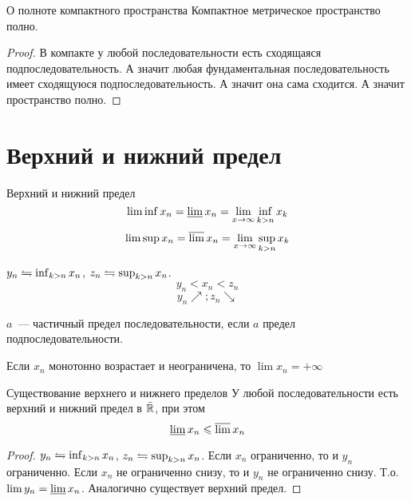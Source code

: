 \begin{theorem}{О полноте компактного пространства}
Компактное метрическое пространство полно.
\end{theorem}
\begin{proof}
В компакте у любой последовательности есть сходящаяся подпоследовательность. А значит любая фундаментальная последовательность имеет сходящуюся подпоследовательность.
А значит она сама сходится. А значит пространство полно.
\end{proof}

\section{Верхний и нижний предел}

\begin{Def}
Верхний и нижний предел
$$\liminf x_n = \varliminf x_n = \lim_{x\rightarrow\infty}\inf_{k>n} x_k$$
$$\limsup x_n = \varlimsup x_n = \lim_{x\rightarrow\infty}\sup_{k>n} x_k$$
\end{Def}
\begin{Rem}
$y_n \leftrightharpoons \inf_{k>n} x_n$, $z_n \leftrightharpoons \sup_{k>n} x_n$.
$$y_n<x_n<z_n$$
$$y_n \nearrow{}; z_n \searrow$$
\end{Rem}

\begin{Def}
$a$~--- частичный предел последовательности, если $a$ предел подпоследовательности.
\end{Def}

\begin{lemma}
Если $x_n$ монотонно возрастает и неограничена, то $\lim x_n = +\infty$
\end{lemma}

\begin{theorem}{Существование верхнего и нижнего пределов}
У любой последовательности есть верхний и нижний предел в $\bar{\mathbb{R}}$, при этом
$$\varliminf x_n \leqslant \varlimsup x_n$$
\end{theorem}
\begin{proof}
$y_n \leftrightharpoons \inf_{k>n} x_n$, $z_n \leftrightharpoons \sup_{k>n} x_n$.
Если $x_n$ ограниченно, то и $y_n$ ограниченно. Если $x_n$ не ограниченно снизу, то и $y_n$ не ограниченно снизу. Т.о. $\lim y_n = \varliminf x_n$. Аналогично 
существует верхний предел.
\end{proof}

